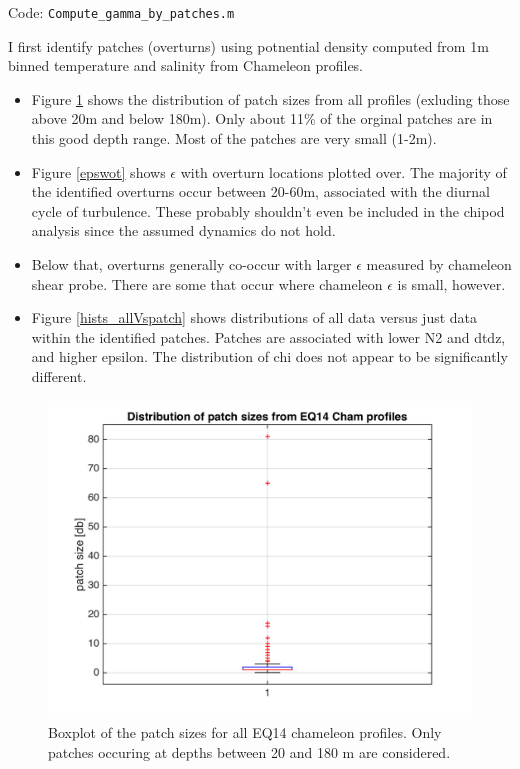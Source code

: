 \documentclass[11pt]{article}
\begin{document}
Code: \verb+Compute_gamma_by_patches.m+

I first identify patches (overturns) using potnential density computed from 1m binned temperature and salinity from Chameleon profiles.

\begin{itemize}
\item Figure \ref{psizebox} shows the distribution of patch sizes from all profiles (exluding those above 20m and below 180m). Only about 11\% of the orginal patches are in this good depth range. Most of the patches are very small (1-2m).
\item Figure \ref{epswot} shows $\epsilon$ with overturn locations plotted over. The majority of the identified overturns occur between 20-60m, associated with the diurnal cycle of turbulence. These probably shouldn't even be included in the chipod analysis since the assumed dynamics do not hold.
\item Below that, overturns generally co-occur with larger $\epsilon$ measured by chameleon shear probe. There are some that occur where chameleon $\epsilon$ is small, however.
\item Figure \ref{hists_allVspatch} shows distributions of all data versus just data within the identified patches. Patches are associated with lower N2 and dtdz, and higher epsilon. The distribution of chi does not appear to be significantly different.
\end{itemize}



\begin{figure}[htbp]
\includegraphics[scale=0.8]{GamByPatch_patchsize_boxplot.png}
\caption{Boxplot of the patch sizes for all EQ14 chameleon profiles. Only patches occuring at depths between 20 and 180 m are considered.}
\label{psizebox}
\end{figure}
\end{document}
